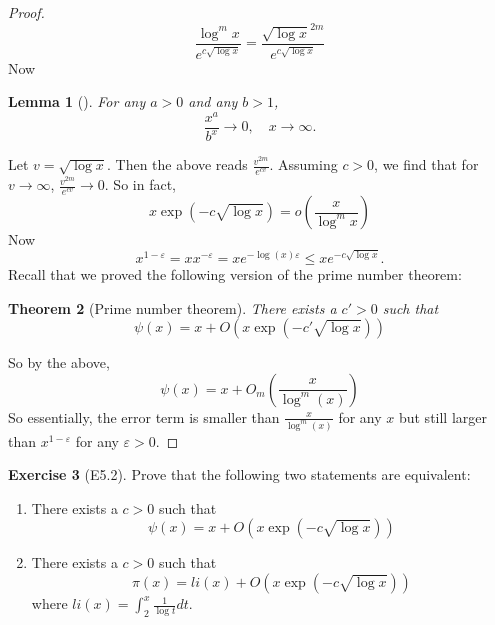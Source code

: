 \documentclass[reqno]{amsart}
\newtheorem{theorem}{Theorem}[section]
\newtheorem{lemma}[theorem]{Lemma}
\theoremstyle{definition}
\newtheorem{exercise}[theorem]{Exercise}
\theoremstyle{remark}
\begin{document}
\begin{proof}
    \[
    \frac{\log^{m} x}{e^{c \sqrt{\log x} }}
    = \frac{ \sqrt{\log x}^{2m}}{e^{c \sqrt{\log x} }}
    \] 
    Now
    \begin{lemma}[]
        For any $a > 0$ and any  $b > 1$,
        \[
        \frac{x^{a}}{b^{x}} \to 0, \quad x \to \infty.
        \] 
    \end{lemma}
        Let $v = \sqrt{\log x} $. Then
        the above reads
        $\frac{v^{2m}}{e^{cv}}$.
        Assuming $c > 0$, we find that for
        $v \to \infty$,
        $\frac{v^{2m}}{e^{cv}} \to 0$.
        So in fact,
        \[
        x \exp \left( -c \sqrt{\log x}  \right) 
        = o \left( \frac{x}{\log^{m} x} \right) 
        \] 
        Now
        \[
        x^{1-\varepsilon} = x
        x^{-\varepsilon} = 
        x e^{- \log (x) \varepsilon}
        \le x e^{- c \sqrt{\log x} }.
        \] 
        Recall that we proved the following version of
        the prime number theorem:
        \begin{theorem}[Prime number theorem]
            There exists a $c' > 0$ such that
            \[
            \psi (x) =
            x + O \left( x
            \exp \left( -c' \sqrt{\log x}  \right) \right) 
            \] 
        \end{theorem}
        So by the above,
        \[
        \psi (x) = x +
        O_m \left( \frac{x}{\log^{m}(x)} \right) 
        \] 
        So essentially, the error
        term is smaller than
        $\frac{x}{\log^{m}(x)}$ for any $x$ but still
        larger than $x^{1-\varepsilon}$ for any
        $\varepsilon > 0$.
\end{proof}

\begin{exercise}[E5.2]
    Prove that the following two statements are equivalent:
    \begin{enumerate}
        \item There exists a $c >0$ such that
            \[
            \psi (x) = x + O\left( x \exp
            \left( -c \sqrt{\log x}  \right) \right) 
            \] 
        \item There exists a $c > 0$ such that
            \[
            \pi(x) = li(x) + O \left( x \exp
            \left( - c \sqrt{\log x}  \right) \right) 
            \] 
            where $li (x) = \int_{2}^{x} \frac{1}{\log t} dt $.
    \end{enumerate}
\end{exercise}
\end{document}

